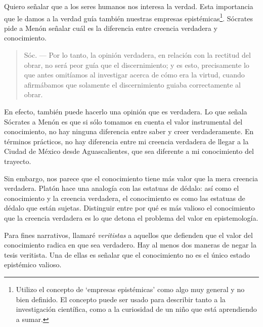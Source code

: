 {Quiero señalar que a los seres humanos nos interesa la verdad.
Esta importancia que le damos a la verdad guía también nuestras empresas epistémicas\footnote{Utilizo el concepto de ‘empresas epistémicas’ como algo muy general y no bien definido. El concepto puede ser usado para describir tanto a la investigación científica, como a la curiosidad de un niño que está aprendiendo a sumar.}.
Sócrates pide a Menón señalar cuál es la diferencia entre creencia verdadera y conocimiento.

\begin{quote}
    Sóc. — Por lo tanto, la opinión verdadera, en relación con la rectitud del obrar, no será peor guía que el discernimiento; y es esto, precisamente lo que antes omitíamos al investigar acerca de cómo era la virtud, cuando afirmábamos que solamente el discernimiento guiaba correctamente al obrar.
\end{quote}

En efecto, también puede hacerlo una opinión que es verdadera.
Lo que señala Sócrates a Menón es que si sólo tomamos en cuenta el valor instrumental del conocimiento, no hay ninguna diferencia entre saber y creer verdaderamente.
En términos prácticos, no hay diferencia entre mi creencia verdadera de llegar a la Ciudad de México desde Aguascalientes, que sea diferente a mi conocimiento del trayecto.

Sin embargo, nos parece que el conocimiento tiene más valor que la mera creencia verdadera.
Platón hace una analogía con las estatuas de dédalo: así como el conocimiento y la creencia verdadera, el conocimiento es como las estatuas de dédalo que están sujetas.
Distinguir entre por qué es más valioso el conocimiento que la creencia verdadera es lo que detona el problema del valor en epistemología.

Para fines narrativos, llamaré \emph{veritistas} a aquellos que defienden que el valor del conocimiento radica en que sea verdadero.
Hay al menos dos maneras de negar la tesis veritista.
Una de ellas es señalar que el conocimiento no es el único estado epistémico valioso.


}
